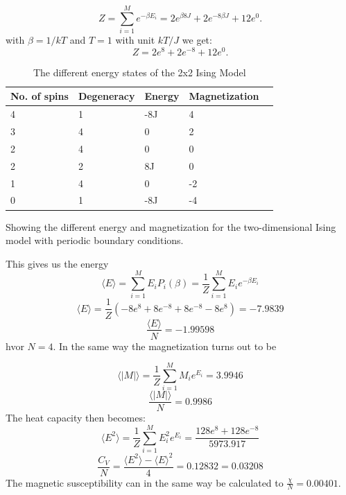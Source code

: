 \documentclass[twoside,twocolumn]{article}
\begin{document}
\[
Z = \sum_{i= 1}^{M} e^{-\beta E_i} = 2e^{\beta8J}+2e^{-8\beta J}+12e^0.
\]
with $\beta = 1/kT$ and $T = 1$ with unit $kT/J$ we get:
\[
Z = 2e^{8}+2e^{-8}+12e^0.
\]
\begin{table}[h]
  \begin{threeparttable}
    \caption{The different energy states of the 2x2 Ising Model}
     \begin{tabular}{lllll}
        \toprule
        No. of spins & Degeneracy & Energy & Magnetization &  \\
        \midrule
                
        4    & 1        & -8J   & 4       	   \\
        3    & 4        &  0    & 2          \\
        2    & 4        &  0    & 0          \\
        2    & 2        &  8J   & 0          \\
        1    & 4        &  0    & -2          \\
        0    & 1        & -8J   & -4          \\
        \bottomrule
     \end{tabular}
    \begin{tablenotes}
      \small
      \item Showing the different energy and magnetization for the two-dimensional Ising model with periodic boundary conditions.
    \end{tablenotes} 
  \end{threeparttable}
  
\end{table}

This gives us the energy
\begin{equation}
\langle E \rangle=  \sum_{i= 1}^{M} E_iP_i(\beta) =\frac{1}{Z} \sum_{i= 1}^{M} E_ie^{-\beta E_i}
\end{equation}
\[
\langle E \rangle=  \frac{1}{Z}(-8e^8 +8e^{-8} +8e^{-8}-8e^{8}) = -7.9839
\]
\[
\frac{\langle E \rangle}{N}= -1.99598
\]
hvor $N = 4$. In the same way the magnetization turns out to be

\begin{equation}
\langle |M|\rangle=  \frac{1}{Z}\sum_{i= 1}^{M} M_i e^{E_i} = 3.9946
\end{equation}
\[
\frac{\langle |M| \rangle}{N}= 0.9986
\]
The heat capacity then becomes:
\begin{equation}
\langle E^2 \rangle= \frac{1}{Z} \sum_{i= 1}^{M} E_i^2e^{E_i}= \frac{128e^8+128e^{-8}}{5973.917}
\end{equation}
\[
\frac{C_V}{N} = \frac{\langle E^2 \rangle -{\langle E \rangle}^2}{4}= 0.12832 = 0.03208
\]
The magnetic susceptibility  can in the same way be calculated to $\frac{\chi}{N} = 0.00401$.
\end{document}
